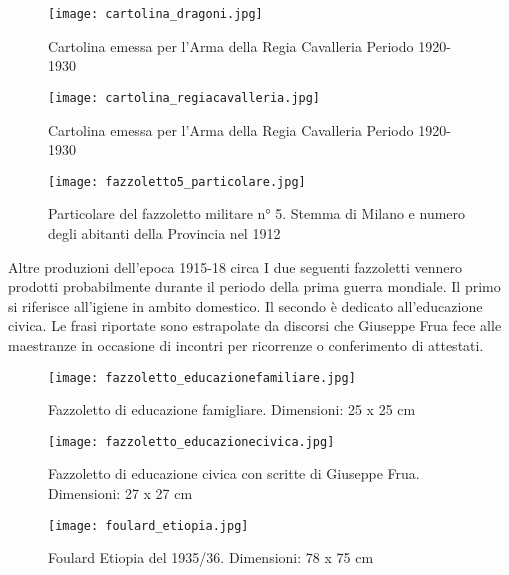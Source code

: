 \newpage

\begin{figure}[h]
	\centering
		\texttt{[image: cartolina\_dragoni.jpg]}
	\caption{Cartolina emessa per l’Arma della Regia Cavalleria Periodo 1920-1930}
	\label{fig:cartolina_dragoni}
\end{figure}

\newpage

\begin{figure}[h]
	\centering
		\texttt{[image: cartolina\_regiacavalleria.jpg]}
	\caption{Cartolina emessa per l’Arma della Regia Cavalleria Periodo 1920-1930}
	\label{fig:cartolina_regiacavalleria}
\end{figure}

\newpage

\begin{figure}[h]
	\centering
		\texttt{[image: fazzoletto5\_particolare.jpg]}
	\caption{Particolare del fazzoletto militare n° 5. Stemma di Milano e numero degli abitanti della Provincia nel 1912}
	\label{fig:fazzoletto5_particolare}
\end{figure}

\newpage

Altre produzioni dell’epoca 1915-18 circa
    I due seguenti fazzoletti vennero prodotti probabilmente durante  il periodo della prima guerra mondiale. Il primo si riferisce all’igiene in ambito domestico. Il secondo è dedicato all’educazione civica. Le frasi riportate sono estrapolate da discorsi che Giuseppe Frua fece alle maestranze in occasione di incontri per ricorrenze o conferimento di attestati.
    
\begin{figure}[h]
	\centering
		\texttt{[image: fazzoletto\_educazionefamiliare.jpg]}
	\caption{Fazzoletto di educazione famigliare. Dimensioni: 25 x 25 cm}
	\label{fig:fazzoletto_educazionefamiliare}
\end{figure}

\newpage

\begin{figure}[h]
	\centering
		\texttt{[image: fazzoletto\_educazionecivica.jpg]}
	\caption{Fazzoletto di educazione civica  con scritte di Giuseppe Frua. Dimensioni: 27 x 27 cm}
	\label{fig:fazzoletto_educazionecivica}
\end{figure}

\newpage

\begin{figure}[h]
	\centering
		\texttt{[image: foulard\_etiopia.jpg]}
	\caption{Foulard Etiopia del 1935/36. Dimensioni: 78 x 75 cm}
	\label{fig:foulard_etiopia}
\end{figure}

